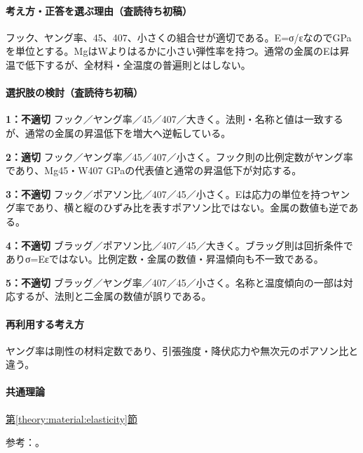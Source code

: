 \paragraph{考え方・正答を選ぶ理由（査読待ち初稿）} フック、ヤング率、45、407、小さくの組合せが適切である。E=σ/εなのでGPaを単位とする。MgはWよりはるかに小さい弾性率を持つ。通常の金属のEは昇温で低下するが、全材料・全温度の普遍則とはしない。

\paragraph{選択肢の検討（査読待ち初稿）}\mbox{}\par

\noindent\textbf{1：不適切} フック／ヤング率／45／407／大きく。法則・名称と値は一致するが、通常の金属の昇温低下を増大へ逆転している。\par

\noindent\textbf{2：適切} フック／ヤング率／45／407／小さく。フック則の比例定数がヤング率であり、Mg45・W407 GPaの代表値と通常の昇温低下が対応する。\par

\noindent\textbf{3：不適切} フック／ポアソン比／407／45／小さく。Eは応力の単位を持つヤング率であり、横と縦のひずみ比を表すポアソン比ではない。金属の数値も逆である。\par

\noindent\textbf{4：不適切} ブラッグ／ポアソン比／407／45／大きく。ブラッグ則は回折条件でありσ=Eεではない。比例定数・金属の数値・昇温傾向も不一致である。\par

\noindent\textbf{5：不適切} ブラッグ／ヤング率／407／45／小さく。名称と温度傾向の一部は対応するが、法則と二金属の数値が誤りである。\par

\paragraph{再利用する考え方} ヤング率は剛性の材料定数であり、引張強度・降伏応力や無次元のポアソン比と違う。

\paragraph{共通理論} \hyperref[theory:material:elasticity]{第\ref*{theory:material:elasticity}節}

\par 参考：\cite{mit_material_elastic2000,princeton_magnesium,princeton_tungsten}。


